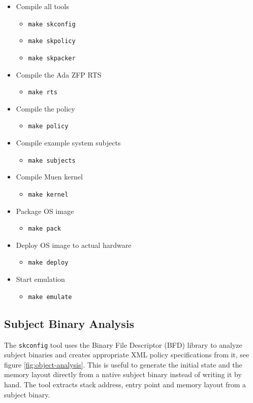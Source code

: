 \begin{itemize}
	\item Compile all tools
	\begin{itemize}
		\item \texttt{make skconfig}
		\item \texttt{make skpolicy}
		\item \texttt{make skpacker}
	\end{itemize}
	\item Compile the Ada ZFP RTS
	\begin{itemize}
		\item \texttt{make rts}
	\end{itemize}
	\item Compile the policy
	\begin{itemize}
		\item \texttt{make policy}
	\end{itemize}
	\item Compile example system subjects
	\begin{itemize}
		\item \texttt{make subjects}
	\end{itemize}
	\item Compile Muen kernel
	\begin{itemize}
		\item \texttt{make kernel}
	\end{itemize}
	\item Package OS image
	\begin{itemize}
		\item \texttt{make pack}
	\end{itemize}
	\item Deploy OS image to actual hardware
	\begin{itemize}
		\item \texttt{make deploy}
	\end{itemize}
	\item Start emulation
	\begin{itemize}
		\item \texttt{make emulate}
	\end{itemize}
\end{itemize}

\subsection{Subject Binary Analysis}\label{subsec:subject-binary-analysis}
The \texttt{skconfig} tool uses the Binary File Descriptor (BFD)
library to analyze subject binaries and creates appropriate XML
policy specifications from it, see figure \ref{fig:object-analysis}. This is
useful to generate the initial state and the memory layout directly from a
native subject binary instead of writing it by hand. The tool extracts stack
address, entry point and memory layout from a subject binary.

